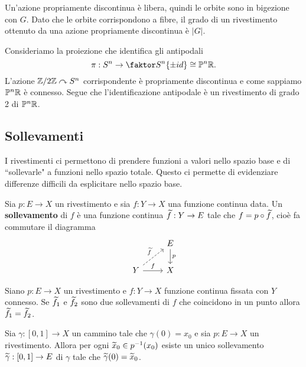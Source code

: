 \begin{multicols*}{2}
\begin{remark}\label{GradoRivestimentiDaAzioniPropriamenteDiscontinue}
Un'azione propriamente discontinua è libera, quindi le orbite sono in bigezione con $G$. Dato che le orbite corrispondono a fibre, il grado di un rivestimento ottenuto da una azione propriamente discontinua è $|G|$.
\end{remark}

\begin{remark}
Consideriamo la proiezione che identifica gli antipodali
\[\pi:S^n\to\quot{S^n}{\{\pm id\}}\cong \Pj^n\R.\]
L'azione ${\mathbb{Z}/2\mathbb{Z}}\curvearrowright S^n$ corrispondente è propriamente discontinua e come sappiamo $\mathbb{P}^n\mathbb{R}$ è connesso. Segue che l'identificazione antipodale è un rivestimento di grado 2 di $\mathbb{P}^n\mathbb{R}$.
\end{remark}


\subsection{Sollevamenti}
I rivestimenti ci permettono di prendere funzioni a valori nello spazio base e di ``sollevarle" a funzioni nello spazio totale. Questo ci permette di evidenziare differenze difficili da esplicitare nello spazio base.
\begin{definition}[Sollevamento]
Sia $p:E\to X$ un rivestimento e sia $f:Y\to X$ una funzione continua data. Un \textbf{sollevamento} di $f$ è una funzione continua $\widetilde{f}:Y\to E$ tale che $f=p\circ \widetilde{f}$, cioè fa commutare il diagramma
\[\begin{tikzcd}
	& E \\
	Y & X
	\arrow["f", from=2-1, to=2-2]
	\arrow["p", from=1-2, to=2-2]
	\arrow["{\wt f}", dashed, from=2-1, to=1-2]
\end{tikzcd}\]
\end{definition}

\begin{theorem}\label{UnicitaSollevamenti}
Siano $p:E\to X$ un rivestimento e $f:Y\to X$ funzione continua fissata con $Y$ connesso. Se $\widetilde{f}_1$ e $\widetilde{f}_2$ sono due sollevamenti di $f$ che coincidono in un punto allora $\widetilde{f}_1=\widetilde{f}_2$.
\end{theorem}


\begin{theorem}\label{EsistenzaUnicitaSollevamentoCammini}
Sia $\gamma:[0,1]\to X$ un cammino tale che $\gamma(0)=x_0$ e sia $p:E\to X$ un rivestimento. Allora per ogni $\widetilde{x}_0\in p^{-1}(x_0)$ esiste un unico sollevamento $\widetilde{\gamma}:[0,1]\to E$ di $\gamma$ tale che $\widetilde{\gamma}(0)=\widetilde{x}_0$.
\end{theorem}



\end{multicols*}
